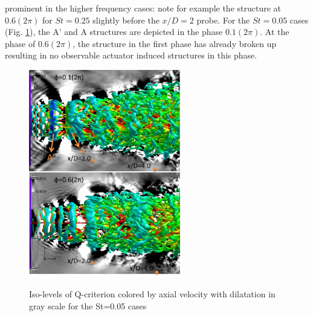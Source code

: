 \documentclass[english]{aiaa-tc}
\begin{document}
prominent in the higher frequency cases: note for example the
structure at $0.6(2\pi)$ for $St=0.25$ slightly before the $x/D=2$
probe.
For the $St=0.05$ cases (Fig. \ref{fig:isolevels05}), the A' and A structures are depicted in the phase $0.1(2\pi)$. At the phase of $0.6(2\pi)$, the structure in the first phase has already broken up resulting in no observable actuator induced structures in this phase.
\begin{figure}
\begin{center}
\begin{centering}
{\includegraphics[width=2.6in]{M09St005qcritphase0106AB}}
\end{centering}
\caption{Iso-levels of Q-criterion colored by axial velocity with dilatation in gray scale for the St=0.05 cases}
\label{fig:isolevels05}
\end{center}
\end{figure}
\end{document}
